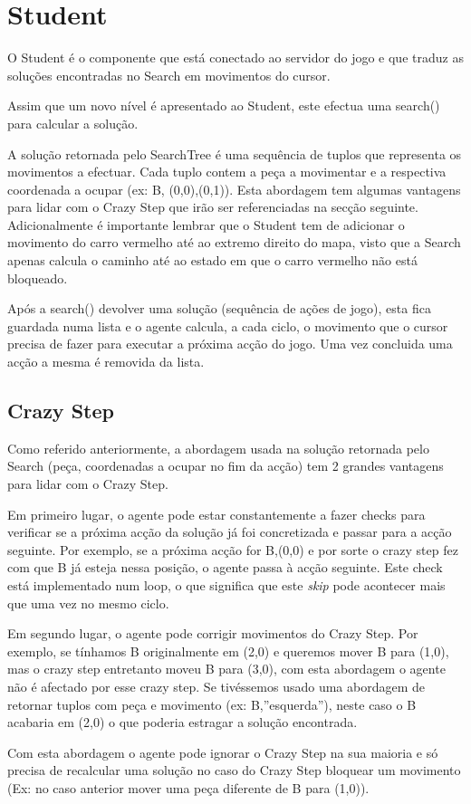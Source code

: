 \documentclass[12pt]{report}
\begin{document}
\section{Student}
\par O Student é o componente que está conectado ao servidor do jogo e que traduz as soluções encontradas no Search em movimentos do cursor.
\par Assim que um novo nível é apresentado ao Student, este efectua uma search() para calcular a solução. 
\par A solução retornada pelo SearchTree é uma sequência de tuplos que representa os movimentos a efectuar. Cada tuplo contem a peça a movimentar e a respectiva coordenada a ocupar (ex: B, (0,0),(0,1)). Esta abordagem tem algumas vantagens para lidar com o Crazy Step que irão ser referenciadas na secção seguinte. Adicionalmente é importante lembrar que o Student tem de adicionar o movimento do carro vermelho até ao extremo direito do mapa, visto que a Search apenas calcula o caminho até ao estado em que o carro vermelho não está bloqueado.
\par Após a search() devolver uma solução (sequência de ações de jogo), esta fica guardada numa lista e o agente calcula, a cada ciclo, o movimento que o cursor precisa de fazer para executar a próxima acção do jogo. Uma vez concluida uma acção a mesma é removida da lista.

\subsection{Crazy Step}
\par Como referido anteriormente, a abordagem usada na solução retornada pelo Search (peça, coordenadas a ocupar no fim da acção) tem 2 grandes vantagens para lidar com o Crazy Step.
\par Em primeiro lugar, o agente pode estar constantemente a fazer checks para verificar se a próxima acção da solução já foi concretizada e passar para a acção seguinte. Por exemplo, se a próxima acção for B,(0,0) e por sorte o crazy step fez com que B já esteja nessa posição, o agente passa à acção seguinte. Este check está implementado num loop, o que significa que este \emph{skip} pode acontecer mais que uma vez no mesmo ciclo.
\par Em segundo lugar, o agente pode corrigir movimentos do Crazy Step. Por exemplo, se tínhamos B originalmente em (2,0) e queremos mover B para (1,0), mas o crazy step entretanto moveu B para (3,0), com esta abordagem o agente não é afectado por esse crazy step. Se tivéssemos usado uma abordagem de retornar tuplos com peça e movimento (ex: B,”esquerda”), neste caso o B acabaria em (2,0) o que poderia estragar a solução encontrada.
\par Com esta abordagem o agente pode ignorar o Crazy Step na sua maioria e só precisa de recalcular uma solução no caso do Crazy Step bloquear um movimento (Ex: no caso anterior mover uma peça diferente de B para (1,0)).
\end{document}

